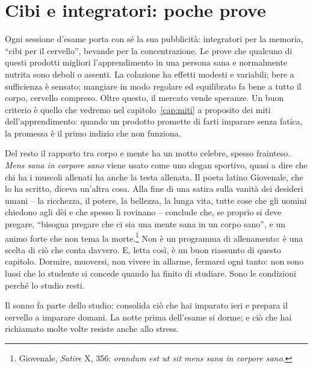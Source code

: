 \section{Cibi e integratori: poche prove}

Ogni sessione d'esame porta con sé la sua pubblicità: integratori per
la memoria, \enquote{cibi per il cervello}, bevande per la
concentrazione. Le prove che qualcuno di questi prodotti migliori
l'apprendimento in una persona sana e normalmente nutrita sono deboli
o assenti. La colazione ha effetti modesti e variabili; bere a
sufficienza è sensato; mangiare in modo regolare ed equilibrato fa
bene a tutto il corpo, cervello compreso. Oltre questo, il mercato
vende speranze. Un buon criterio è quello che vedremo nel
capitolo~\ref{cap:miti} a proposito dei miti dell'apprendimento:
quando un prodotto promette di farti imparare senza fatica, la promessa
è il primo indizio che non funziona.

Del resto il rapporto tra corpo e mente ha un motto celebre, spesso
frainteso. \emph{Mens sana in corpore sano} viene usato come uno
slogan sportivo, quasi a dire che chi ha i muscoli allenati ha anche la
testa allenata. Il poeta latino Giovenale, che lo ha scritto, diceva
un'altra cosa. Alla fine di una satira sulla vanità dei desideri umani
-- la ricchezza, il potere, la bellezza, la lunga vita, tutte cose che
gli uomini chiedono agli dèi e che spesso li rovinano -- conclude che,
se proprio si deve pregare, \enquote{bisogna pregare che ci sia una
mente sana in un corpo sano}, e un animo forte che non tema la
morte.\footnote{Giovenale, \emph{Satire} X, 356: \emph{orandum est ut
sit mens sana in corpore sano}.} Non è un programma di allenamento: è
una scelta di ciò che conta davvero. E, letta così, è un buon
riassunto di questo capitolo. Dormire, muoversi, non vivere in allarme,
fermarsi ogni tanto: non sono lussi che lo studente si concede quando
ha finito di studiare. Sono le condizioni perché lo studio resti.

\begin{daricordare}
Il sonno fa parte dello studio: consolida ciò che hai imparato ieri e
prepara il cervello a imparare domani. La notte prima dell'esame si
dorme; e ciò che hai richiamato molte volte resiste anche allo stress.
\end{daricordare}

